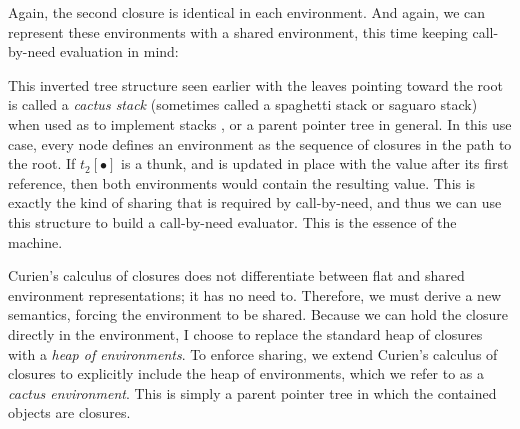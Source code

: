 Again, the second closure is identical in each environment.  And again,
we can represent these environments with a shared environment, this time
keeping call-by-need evaluation in mind:
\begin{center}
\end{center}
This inverted tree structure seen earlier with the leaves pointing toward the
root is called a \emph{cactus stack} (sometimes called a spaghetti stack or
saguaro stack) when used as to implement stacks
\cite{hauck1968burroughs,ichbiah1991rationale}, or a parent pointer tree in
general. In this use case, every node defines an environment as the sequence of
closures in the path to the root.  If $t_2[\bullet]$ is a thunk, and is updated
in place with the value after its first reference, then both environments would
contain the resulting value. This is exactly the kind of sharing that is
required by call-by-need, and thus we can use this structure to build a
call-by-need evaluator. This is the essence of the \ce machine. 

Curien's calculus of closures does not differentiate between flat and shared
environment representations; it has no need to. Therefore, we must derive a new
semantics, forcing the environment to be shared. Because we can hold the closure
directly in the environment, I choose to replace the standard heap of closures
with a \emph{heap of environments}. To enforce sharing, we extend Curien's
calculus of closures to explicitly include the heap of environments, which we
refer to as a \emph{cactus environment}. This is simply a parent pointer tree in
which the contained objects are closures. 

